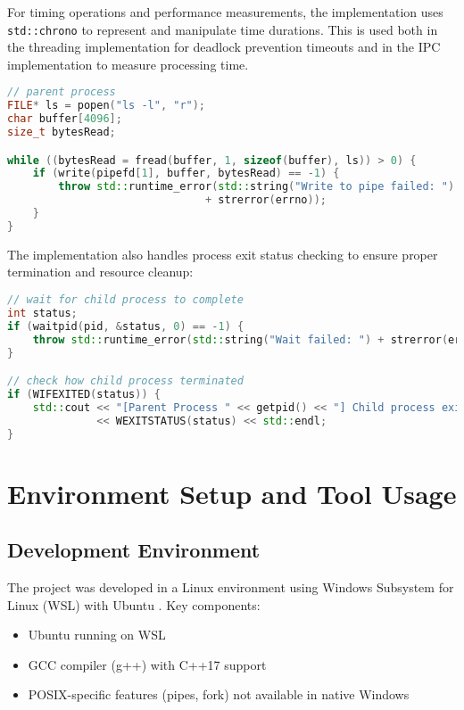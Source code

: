 \documentclass[12pt]{article}
\begin{document}
For timing operations and performance measurements, the implementation uses \texttt{std::chrono} \cite{cpp_chrono}  to represent and manipulate time durations. This is used both in the threading implementation for deadlock prevention timeouts and in the IPC implementation to measure processing time.

\begin{lstlisting}[language=C++, caption=Parent Process Writing to Pipe]
// parent process
FILE* ls = popen("ls -l", "r");
char buffer[4096];
size_t bytesRead;

while ((bytesRead = fread(buffer, 1, sizeof(buffer), ls)) > 0) {
    if (write(pipefd[1], buffer, bytesRead) == -1) {
        throw std::runtime_error(std::string("Write to pipe failed: ") 
                               + strerror(errno));
    }
}
\end{lstlisting}

The implementation also handles process exit status checking \cite{exit_status} to ensure proper termination and resource cleanup:

\begin{lstlisting}[language=C++, caption=Checking Child Process Exit Status]
// wait for child process to complete
int status;
if (waitpid(pid, &status, 0) == -1) {
    throw std::runtime_error(std::string("Wait failed: ") + strerror(errno));
}

// check how child process terminated
if (WIFEXITED(status)) {
    std::cout << "[Parent Process " << getpid() << "] Child process exited with status " 
              << WEXITSTATUS(status) << std::endl;
}
\end{lstlisting}

\section{Environment Setup and Tool Usage}
\subsection{Development Environment}
The project was developed in a Linux environment using Windows Subsystem for Linux (WSL) with Ubuntu \cite{microsoft_wsl_install}. Key components:

\begin{itemize}
    \item Ubuntu running on WSL
    \item GCC compiler (g++) with C++17 support
    \item POSIX-specific features (pipes, fork) not available in native Windows
\end{itemize}
\end{document}
